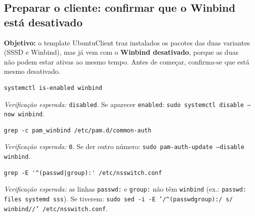 
\subsection[Preparar o cliente: confirmar que o Winbind está desativado]{Preparar o cliente: confirmar que o Winbind está desativado}


\textbf{Objetivo:} o template UbuntuClient traz instalados os pacotes das duas variantes (SSSD e Winbind), mas já vem com o \textbf{Winbind desativado}, porque as duas não podem estar ativas ao mesmo tempo. Antes de começar, confirma-se que está mesmo desativado.


\begin{lstlisting}[style=bashstyle]
systemctl is-enabled winbind
\end{lstlisting}

\emph{Verificação esperada:} \texttt{disabled}. Se aparecer \texttt{enabled}: \texttt{sudo systemctl disable --now winbind}.


\begin{lstlisting}[style=bashstyle]
grep -c pam_winbind /etc/pam.d/common-auth
\end{lstlisting}

\emph{Verificação esperada:} \texttt{0}. Se der outro número: \texttt{sudo pam-auth-update --disable winbind}.


\begin{lstlisting}[style=bashstyle]
grep -E '^(passwd|group):' /etc/nsswitch.conf
\end{lstlisting}

\emph{Verificação esperada:} as linhas \texttt{passwd:} e \texttt{group:} não têm \texttt{winbind} (ex.: \texttt{passwd: files systemd sss}). Se tiverem: \texttt{sudo sed -i -E '/\allowbreak{}\textasciicircum{}(passwd\textbar{}group):/\allowbreak{} s/\allowbreak{} winbind/\allowbreak{}/\allowbreak{}' /\allowbreak{}etc/\allowbreak{}nsswitch.conf}.

